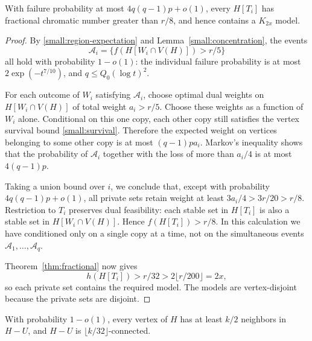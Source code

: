 \begin{lemma}\label{small:private}
With failure probability at most $4q(q-1)p+o(1)$, every $H[T_i]$ has
fractional chromatic number greater than $r/8$, and hence contains a
$K_{2x}$ model.
\end{lemma}

\begin{proof}
By \eqref{small:region-expectation} and
Lemma~\ref{small:concentration}, the events
\[
 \mathcal A_i=\{f(H[W_i\cap V(H)])>r/5\}
\]
all hold with probability $1-o(1)$: the individual failure probability
is at most $2\exp(-t^{7/10})$, and $q\le Q_0(\log t)^2$.

For each outcome of $W_i$ satisfying $\mathcal A_i$, choose optimal dual
weights on $H[W_i\cap V(H)]$ of total weight $a_i>r/5$.
Choose these weights as a function of $W_i$ alone. Conditional on this
one copy, each other copy still satisfies the vertex survival bound
\eqref{small:survival}. Therefore the expected weight on vertices
belonging to some other copy is at most $(q-1)pa_i$. Markov's inequality
shows that the probability of $\mathcal A_i$ together with the loss of
more than $a_i/4$ is at most $4(q-1)p$.

Taking a union bound over $i$, we conclude that, except with probability
$4q(q-1)p+o(1)$, all private sets retain weight at least
$3a_i/4>3r/20>r/8$. Restriction to $T_i$ preserves dual feasibility:
each stable set in $H[T_i]$ is also a stable set in
$H[W_i\cap V(H)]$. Hence $f(H[T_i])>r/8$. In this calculation we have
conditioned only on a single copy at a time, not on the simultaneous
events $\mathcal A_1,\ldots,\mathcal A_q$.

Theorem~\ref{thm:fractional} now gives
\[
 h(H[T_i])>r/32>2\lfloor r/200\rfloor=2x,
\]
so each private set contains the required model. The models are
vertex-disjoint because the private sets are disjoint.
\end{proof}

\begin{lemma}\label{small:complement}
With probability $1-o(1)$, every vertex of $H$ has at least $k/2$
neighbors in $H-U$, and $H-U$ is $\lfloor k/32\rfloor$-connected.
\end{lemma}

